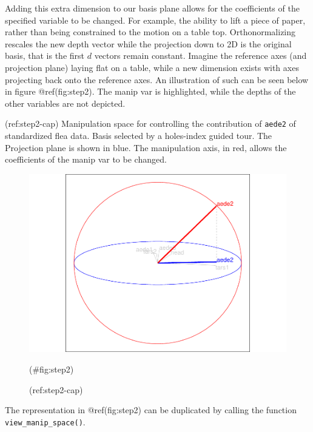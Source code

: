 Adding this extra dimension to our basis plane allows for the coefficients of the specified variable to be changed. For example, the ability to lift a piece of paper, rather than being constrained to the motion on a table top. Orthonormalizing rescales the new depth vector while the projection down to 2D is the original basis, that is the first \(d\) vectors remain constant. Imagine the reference axes (and projection plane) laying flat on a table, while a new dimension exists with axes projecting back onto the reference axes. An illustration of such can be seen below in figure @ref(fig:step2). The manip var is highlighted, while the depths of the other variables are not depicted.

(ref:step2-cap) Manipulation space for controlling the contribution of \texttt{aede2} of standardized flea data. Basis selected by a holes-index guided tour. The Projection plane is shown in blue. The manipulation axis, in red, allows the coefficients of the manip var to be changed.

\begin{Schunk}
\begin{figure}

{\centering \includegraphics[width=1\linewidth]{spinifex_paper_files/figure-latex/step2-1} 

}

\caption[(ref:step2-cap)]{(ref:step2-cap)}(\#fig:step2)
\end{figure}
\end{Schunk}

The representation in @ref(fig:step2) can be duplicated by calling the function \texttt{view\_manip\_space()}.

